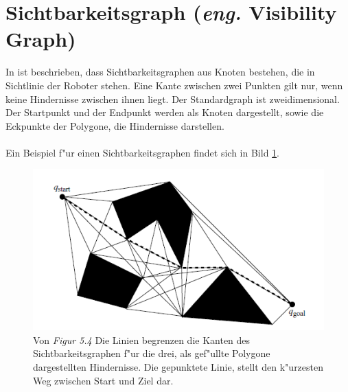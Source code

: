 \section{Sichtbarkeitsgraph (\textit{eng.} Visibility Graph)}
%
%
In \cite{Principles:05} ist beschrieben, dass Sichtbarkeitsgraphen aus Knoten bestehen, die in Sichtlinie der Roboter stehen. Eine Kante zwischen zwei Punkten gilt nur, wenn keine Hindernisse zwischen ihnen liegt. Der Standardgraph ist zweidimensional. Der Startpunkt und der Endpunkt werden als Knoten dargestellt, sowie die Eckpunkte der Polygone, die Hindernisse darstellen.
\\\\
Ein Beispiel f"ur einen Sichtbarkeitsgraphen findet sich in Bild \ref{sec3a}.
\begin{figure} %
	\centering
	\includegraphics[width=\textwidth]{images/Robot_Motion_Visibility_Graph.png}
	\caption{Von \cite[~S. 111]{Principles:05} \textit{Figur 5.4} Die Linien begrenzen die Kanten des Sichtbarkeitsgraphen f"ur die drei, als gef"ullte Polygone dargestellten Hindernisse. Die gepunktete Linie, stellt den k"urzesten Weg zwischen Start und Ziel dar.}
	\label{sec3a}
\end{figure}


